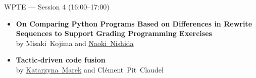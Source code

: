 \documentclass[11pt]{beamer}
\newcommand{\sessionbreaktext}{}
\newenvironment{sessionframe}[2]{%
  \renewcommand{\sessionbreaktext}{#2}%
  \begin{frame}[t]{#1}%
}{%
  \end{frame}%
}
\begin{document}
\begin{sessionframe}{WPTE --- Session 4 (16:00--17:00)}{Business meeting: 17:00--17:30}
  \vspace*{\fill}
  \begin{itemize}
    \item \textbf{On Comparing Python Programs Based on Differences in Rewrite Sequences to Support Grading Programming Exercises}\\
      by \mbox{Misaki Kojima} and \mbox{\underline{Naoki Nishida}}
    \vspace*{\fill}
    \item \textbf{Tactic-driven code fusion}\\
      by \mbox{\underline{Katarzyna Marek}} and \mbox{Clément Pit Claudel}
  \end{itemize}
\end{sessionframe}
\end{document}
